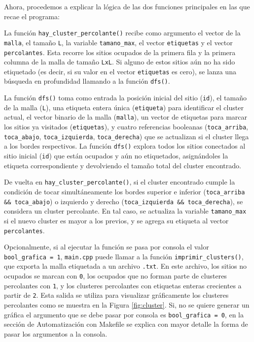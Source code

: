 \documentclass[%
 reprint,
 amsmath,amssymb,
 aps,
]{revtex4-2}
\begin{document}
Ahora, procedemos a explicar la lógica de las dos funciones principales en las que recae el programa:

La función \texttt{hay\_cluster\_percolante()} recibe como argumento el vector de la \texttt{malla}, el tamaño \texttt{L}, la variable \texttt{tamano\_max}, el vector \texttt{etiquetas} y el vector \texttt{percolantes}. Esta recorre los sitios ocupados de la primera fila y la primera columna de la malla de tamaño \texttt{LxL}. Si alguno de estos sitios aún no ha sido etiquetado (es decir, si su valor en el vector \texttt{etiquetas} es cero), se lanza una búsqueda en profundidad llamando a la función \texttt{dfs()}.

La función \texttt{dfs()} toma como entrada la posición inicial del sitio (\texttt{id}), el tamaño de la malla (\texttt{L}), una etiqueta entera única (\texttt{etiqueta}) para identificar el cluster actual, el vector binario de la malla (\texttt{malla}), un vector de etiquetas para marcar los sitios ya visitados (\texttt{etiquetas}), y cuatro referencias booleanas (\texttt{toca\_arriba}, \texttt{toca\_abajo}, \texttt{toca\_izquierda}, \texttt{toca\_derecha}) que se actualizan si el cluster llega a los bordes respectivos. La función \texttt{dfs()} explora todos los sitios conectados al sitio inicial (\texttt{id}) que están ocupados y aún no etiquetados, asignándoles la etiqueta correspondiente y devolviendo el tamaño total del cluster encontrado. 

De vuelta en \texttt{hay\_cluster\_percolante()}, si el cluster encontrado cumple la condición de tocar simultáneamente los bordes superior e inferior (\texttt{toca\_arriba \&\& toca\_abajo}) o izquierdo y derecho (\texttt{toca\_izquierda \&\& toca\_derecha}), se considera un cluster percolante. En tal caso, se actualiza la variable \texttt{tamano\_max} si el nuevo cluster es mayor a los previos, y se agrega su etiqueta al vector \texttt{percolantes}.

Opcionalmente, si al ejecutar la función se pasa por consola el valor \texttt{bool\_grafica = 1}, \texttt{main.cpp} puede llamar a la función \texttt{imprimir\_clusters()}, que exporta la malla etiquetada a un archivo \texttt{.txt}. En este archivo, los sitios no ocupados se marcan con \texttt{0}, los ocupados que no forman parte de clusteres percolantes con \texttt{1}, y los clusteres percolantes con etiquetas enteras crecientes a partir de \texttt{2}. Esta salida se utiliza para visualizar gráficamente los clusteres percolantes como se muestra en la Figura \ref{fig:cluster}. Si, no se quiere generar un gráfica el argumento que se debe pasar por consola es \texttt{bool\_grafica = 0}, en la sección de Automatización con Makefile se explica con mayor detalle la forma de pasar los argumentos a la consola.
\end{document}
